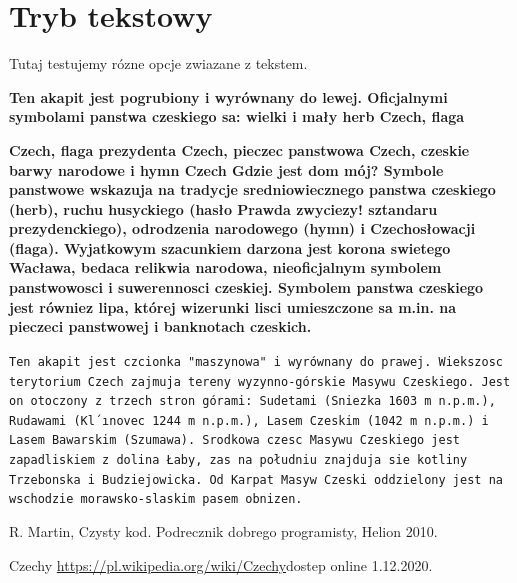 \documentclass[11pt,a4paper]{article}
\begin{document}
\section{Tryb tekstowy}
Tutaj testujemy rózne opcje zwiazane z tekstem.
\\
\begin{flushleft}
\textbf{Ten akapit jest pogrubiony i wyrównany do lewej. Oficjalnymi
symbolami panstwa czeskiego sa: wielki i mały herb Czech, flaga}
\end{flushleft}
\newpage
\begin{flushleft}
\textbf{Czech, flaga prezydenta Czech, pieczec panstwowa Czech, czeskie
barwy narodowe i hymn Czech Gdzie jest dom mój? Symbole
panstwowe wskazuja na tradycje sredniowiecznego panstwa
czeskiego (herb), ruchu husyckiego (hasło Prawda zwyciezy!
sztandaru prezydenckiego), odrodzenia narodowego (hymn) i
Czechosłowacji (flaga). Wyjatkowym szacunkiem darzona jest
korona swietego Wacława, bedaca relikwia narodowa,
nieoficjalnym symbolem panstwowosci i suwerennosci czeskiej.
Symbolem panstwa czeskiego jest równiez lipa, której wizerunki
lisci umieszczone sa m.in. na pieczeci panstwowej i banknotach
czeskich.}
\end{flushleft}
\begin{flushright}
\tt{Ten akapit jest czcionka "maszynowa" i wyrównany do prawej.
Wiekszosc terytorium Czech zajmuja tereny wyzynno-górskie
Masywu Czeskiego. Jest on otoczony z trzech stron górami:
Sudetami (Sniezka 1603 m n.p.m.), Rudawami (Kl´ınovec 1244 m
n.p.m.), Lasem Czeskim (1042 m n.p.m.) i Lasem Bawarskim
(Szumawa). Srodkowa czesc Masywu Czeskiego jest zapadliskiem z
dolina Łaby, zas na południu znajduja sie kotliny Trzebonska i
Budziejowicka. Od Karpat Masyw Czeski oddzielony jest na
wschodzie morawsko-slaskim pasem obnizen.}
\end{flushright}
\begin{thebibliography}{9}
R. Martin, Czysty kod. Podrecznik dobrego programisty, Helion 2010.

{Czechy}
 \url{https://pl.wikipedia.org/wiki/Czechy}{dostep online 1.12.2020.}
\end{thebibliography}
\end{document}
